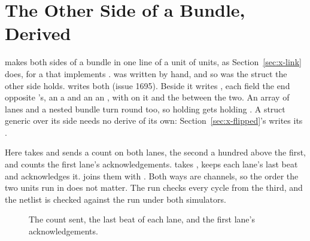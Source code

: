 \section{The Other Side of a Bundle, Derived}
\label{sec:x-hostgen}

 makes both sides of a bundle in one line of a unit
of units, as Section~\ref{sec:x-link} does, for a  that
implements .  was written by hand, and so was the
struct the other side holds.  writes both
(issue 1695). Beside  it writes , each field
the end opposite 's, an  a  and an
 an , with  on it and the 
between the two. An array of lanes and a nested bundle turn round
too, so  holding \code{[Lane; 2]} gets 
holding \code{[LaneHost; 2]}. A struct generic over its side needs no
derive of its own: Section~\ref{sec:x-flipped}'s 
writes its .

Here  takes  and sends a count on both
lanes, the second a hundred above the first, and counts the first
lane's acknowledgements.  takes , keeps each
lane's last beat and acknowledges it.  joins them with
. Both ways are channels, so the order the two
units run in does not matter. The run checks every cycle from the
third, and the netlist is checked against the run under both
simulators.

\begin{figure}[htbp]
\centering

\caption{The count sent, the last beat of each lane, and the first
lane's acknowledgements.}
\label{fig:x-hostgen}
\end{figure}




